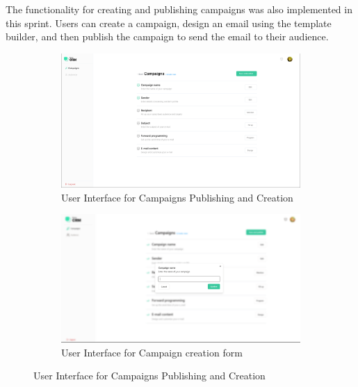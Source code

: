 The functionality for creating and publishing campaigns was also implemented in this sprint. Users can create a campaign, design an email using the template builder, and then publish the campaign to send the email to their audience.

\begin{figure}[ht]
	\centering
	\begin{subfigure}[b]{0.45\linewidth}
		\includegraphics[width=\linewidth]{Images/Sprint1/screenshots/Screenshot 2024-05-26 214028.png}
		\caption{User Interface for Campaigns Publishing and Creation}
		\label{fig:User Interface for Campaigns Publishing and Creation}
	\end{subfigure}
	\hfill
	\begin{subfigure}[b]{0.45\linewidth}
		\includegraphics[width=\linewidth]{Images/Sprint1/screenshots/Screenshot 2024-06-03 202916.png}
		\caption{User Interface for Campaign creation form}
		\label{fig:User Interface for Campaign creation form}
	\end{subfigure}
	\caption{User Interface for Campaigns Publishing and Creation}
\end{figure}


